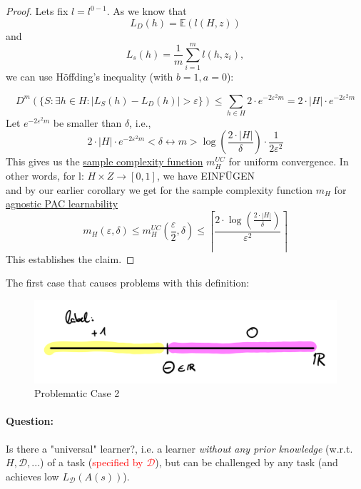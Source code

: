 \documentclass[10pt,a4paper]{article}
\theoremstyle{definition}
\theoremstyle{plain}
\begin{document}
\begin{proof}
	Lets fix $ l = l^{0-1}$. As we know that 
$$
	L_D(h) = \mathbb{E}(l(H, z))
$$ and 
$$
	L_s(h) = \frac{1}{m} \sum_{i = 1}^{m} l(h, z_i),
$$
we can use Höffding's inequality (with $b = 1, a=0$):

$$
	D^{m}(\{ S: \exists h \in H: |L_S(h) - L_D(h)| > \varepsilon\}) \leq \sum_{h \in H} 2 \cdot e^{-2 \varepsilon^2 m} = 2 \cdot |H| \cdot  e^{-2 \varepsilon^2 m}
$$
Let $e^{-2 \varepsilon^2 m}$ be smaller than $\delta$, i.e.,
$$
	2 \cdot |H| \cdot  e^{-2 \varepsilon^2 m} < \delta \leftrightarrow m > \log\left( \frac{2 \cdot |H|}{\delta}\right)\cdot \frac{1}{2 \varepsilon^2}
$$
This gives us the \underline{sample complexity function} $m_{H}^{UC}$ for uniform convergence. In other words, for l: $H \times Z \rightarrow [0,1]$, we have 
EINFÜGEN\\

and by our earlier corollary we get for the sample complexity function $m_H$ for \underline{agnostic PAC learnability} 
$$
	m_H(\varepsilon, \delta) \leq m_H^{UC}\left(\frac{\varepsilon}{2}, \delta\right) \leq \left\lceil \frac{2 \cdot \log\left(\frac{2\cdot |H|}{\delta}\right)}{\varepsilon^2} \right\rceil
$$
This establishes the claim.
\end{proof}
The first case that causes problems with this definition:
\begin{figure}[H]
	\centering
	\includegraphics[width=0.7\linewidth]{sketch_2}
	\caption{Problematic Case 2}
	\label{fig:sketch2}
\end{figure}

\paragraph{Question:} Is there a "universal" learner?, i.e. a learner \textit{without any prior knowledge} (w.r.t. $H, \mathcal{D, ...}$) of a task (\textcolor{red}{specified by $\mathcal{D}$}), but can be challenged by any task (and achieves low $L_\mathcal{D}\left(A\left(s\right)\right)$). 
\end{document}
